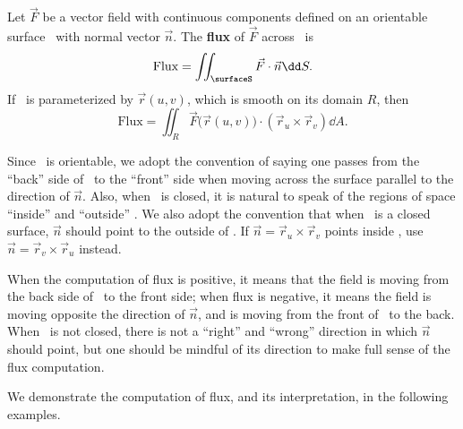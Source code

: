 \begin{definition}\label{def:surfflux}
Let $\vec F$ be a vector field with continuous components defined on an orientable surface \surfaceS\ with normal vector $\vec n$. The \textbf{flux} of $\vec F$ across \surfaceS\ is
\[\text{Flux} = \iint_\surfaceS \vec F\cdot \vec n\dd S.\]
If \surfaceS\ is parameterized by $\vec r(u,v)$, which is smooth on its domain $R$, then
\[
\text{Flux} = \iint_R \vec F\bigl(\vec r(u,v)\bigr)\cdot (\vec r_u\times \vec r_v)\dd A.
\]
\end{definition}

Since \surfaceS\ is orientable, we adopt the convention of saying one passes from the ``back'' side of \surfaceS\ to the ``front'' side when moving across the surface parallel to the direction of $\vec n$. Also, when \surfaceS\ is closed, it is natural to speak of the regions of space ``inside'' and ``outside'' \surfaceS. We also adopt the convention that when \surfaceS\ is a closed surface, $\vec n$ should point to the outside of \surfaceS. If $\vec n = \vec r_u\times\vec r_v$ points inside \surfaceS, use $\vec n = \vec r_v\times \vec r_u$ instead.

When the computation of flux is positive, it means that the field is moving from the back side of \surfaceS\ to the front side; when flux is negative, it means the field is moving opposite the direction of $\vec n$, and is moving from the front of \surfaceS\ to the back. When \surfaceS\ is not closed, there is not a ``right'' and ``wrong'' direction in which $\vec n$ should point, but one should be mindful of its direction to make full sense of the flux computation.

We demonstrate the computation of flux, and its interpretation, in the following examples.


